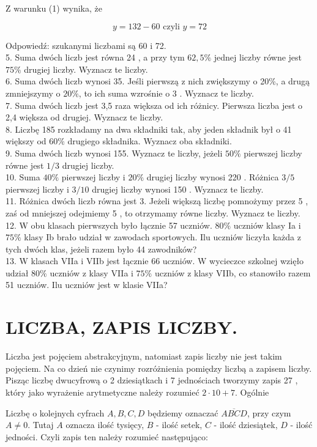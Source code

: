 \documentclass[10pt]{article}
\begin{document}
Z warunku (1) wynika, że

\[
y=132-60 \text { czyli } y=72
\]

Odpowiedź: szukanymi liczbami są 60 i 72.\\
5. Suma dwóch liczb jest równa 24 , a przy tym \(62,5 \%\) jednej liczby równe jest \(75 \%\) drugiej liczby. Wyznacz te liczby.\\
6. Suma dwóch liczb wynosi 35. Jeśli pierwszą z nich zwiększymy o 20\%, a drugą zmniejszymy o \(20 \%\), to ich suma wzrośnie o 3 . Wyznacz te liczby.\\
7. Suma dwóch liczb jest 3,5 raza większa od ich różnicy. Pierwsza liczba jest o 2,4 większa od drugiej. Wyznacz te liczby.\\
8. Liczbę 185 rozkładamy na dwa składniki tak, aby jeden składnik był o 41 większy od \(60 \%\) drugiego składnika. Wyznacz oba składniki.\\
9. Suma dwóch liczb wynosi 155. Wyznacz te liczby, jeżeli \(50 \%\) pierwszej liczby równe jest \(1 / 3\) drugiej liczby.\\
10. Suma \(40 \%\) pierwszej liczby i \(20 \%\) drugiej liczby wynosi 220 . Różnica \(3 / 5\) pierwszej liczby i \(3 / 10\) drugiej liczby wynosi 150 . Wyznacz te liczby.\\
11. Różnica dwóch liczb równa jest 3. Jeżeli większą liczbę pomnożymy przez 5 , zaś od mniejszej odejmiemy 5 , to otrzymamy równe liczby. Wyznacz te liczby.\\
12. W obu klasach pierwszych było łącznie 57 uczniów. \(80 \%\) uczniów klasy Ia i \(75 \%\) klasy Ib brało udział w zawodach sportowych. Ilu uczniów liczyła każda z tych dwóch klas, jeżeli razem było 44 zawodników?\\
13. W klasach VIIa i VIIb jest łącznie 66 uczniów. W wycieczce szkolnej wzięło udział \(80 \%\) uczniów z klasy VIIa i \(75 \%\) uczniów z klasy VIIb, co stanowiło razem 51 uczniów. Ilu uczniów jest w klasie VIIa?

\section*{LICZBA, ZAPIS LICZBY.}
Liczba jest pojęciem abstrakcyjnym, natomiast zapis liczby nie jest takim pojęciem. Na co dzień nie czynimy rozróżnienia pomiędzy liczbą a zapisem liczby. Pisząc liczbę dwucyfrową o 2 dziesiątkach i 7 jednościach tworzymy zapis 27 , który jako wyrażenie arytmetyczne należy rozumieć \(2 \cdot 10+7\). Ogólnie

Liczbę o kolejnych cyfrach \(A, B, C, D\) będziemy oznaczać \(\overline{A B C D}\), przy czym \(A \neq 0\). Tutaj \(A\) oznacza ilość tysięcy, \(B\) - ilość setek, \(C\) - ilość dziesiątek, \(D\) - ilość jedności. Czyli zapis ten należy rozumieć następująco:
\end{document}
